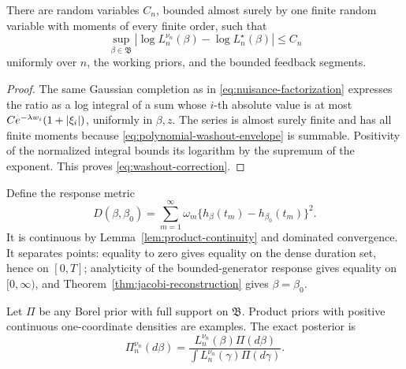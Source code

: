 \begin{lemma}
\label{lem:washout-correction}
There are random variables \(C_n\), bounded almost surely by one finite random
variable with moments of every finite order, such that
\begin{equation}
 \sup_{\beta\in\mathfrak B}
 \left|\log L_n^{\nu_n}(\beta)-\log L_n^\star(\beta)\right|
 \le C_n
 \label{eq:washout-correction}
\end{equation}
uniformly over \(n\), the working priors, and the bounded feedback segments.
\end{lemma}

\begin{proof}
The same Gaussian completion as in \eqref{eq:nuisance-factorization}
expresses the ratio as a log integral of a sum whose \(i\)-th absolute value
is at most
\(Ce^{-\lambda w_i}(1+\left|\xi_i\right|)\), uniformly in \(\beta,z\).  The series
is almost surely finite and has all finite moments because \eqref{eq:polynomial-washout-envelope} is summable.  Positivity of the normalized integral bounds its logarithm by
the supremum of the exponent.  This proves \eqref{eq:washout-correction}.
\end{proof}

Define the response metric
\begin{equation}
 D(\beta,\beta_0)=
 \sum_{m=1}^\infty\omega_m
 \{h_\beta(t_m)-h_{\beta_0}(t_m)\}^2.
 \label{eq:response-metric}
\end{equation}
It is continuous by Lemma~\ref{lem:product-continuity} and dominated
convergence.  It separates points: equality to zero gives equality on the
dense duration set, hence on \([0,T]\); analyticity of the bounded-generator
response gives equality on \([0,\infty)\), and
Theorem~\ref{thm:jacobi-reconstruction} gives \(\beta=\beta_0\).

Let \(\Pi\) be any Borel prior with full support on \(\mathfrak B\).  Product
priors with positive continuous one-coordinate densities are examples.  The
exact posterior is
\[
 \Pi_n^{\nu_n}(d\beta)
 =\frac{L_n^{\nu_n}(\beta)\Pi(d\beta)}
        {\int L_n^{\nu_n}(\gamma)\Pi(d\gamma)}.
\]

